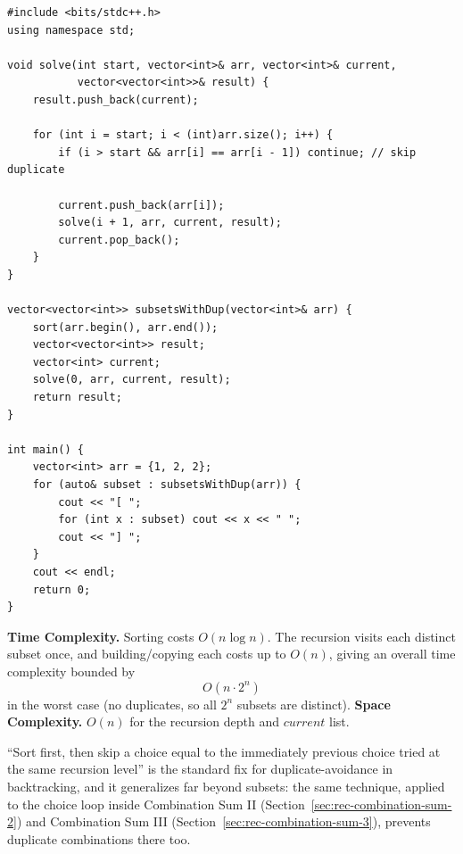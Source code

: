 \begin{lstlisting}
#include <bits/stdc++.h>
using namespace std;

void solve(int start, vector<int>& arr, vector<int>& current,
           vector<vector<int>>& result) {
    result.push_back(current);

    for (int i = start; i < (int)arr.size(); i++) {
        if (i > start && arr[i] == arr[i - 1]) continue; // skip duplicate

        current.push_back(arr[i]);
        solve(i + 1, arr, current, result);
        current.pop_back();
    }
}

vector<vector<int>> subsetsWithDup(vector<int>& arr) {
    sort(arr.begin(), arr.end());
    vector<vector<int>> result;
    vector<int> current;
    solve(0, arr, current, result);
    return result;
}

int main() {
    vector<int> arr = {1, 2, 2};
    for (auto& subset : subsetsWithDup(arr)) {
        cout << "[ ";
        for (int x : subset) cout << x << " ";
        cout << "] ";
    }
    cout << endl;
    return 0;
}
\end{lstlisting}

\begin{complexitybox}
\textbf{Time Complexity.} Sorting costs $O(n \log n)$. The recursion
visits each distinct subset once, and building/copying each costs up to
$O(n)$, giving an overall time complexity bounded by
\[
  O(n \cdot 2^n)
\]
in the worst case (no duplicates, so all $2^n$ subsets are distinct).
\textbf{Space Complexity.} $O(n)$ for the recursion depth and
$\textit{current}$ list.
\end{complexitybox}

\begin{takeawaybox}
``Sort first, then skip a choice equal to the immediately previous
choice tried at the same recursion level'' is the standard fix for
duplicate-avoidance in backtracking, and it generalizes far beyond
subsets: the same technique, applied to the choice loop inside
Combination Sum II (Section~\ref{sec:rec-combination-sum-2}) and
Combination Sum III (Section~\ref{sec:rec-combination-sum-3}), prevents
duplicate combinations there too.
\end{takeawaybox}
